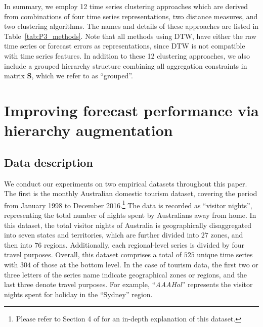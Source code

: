 \documentclass[a4paper,review,12pt,authoryear]{elsarticle}
\begin{document}
In summary, we employ 12 time series clustering approaches which are derived from combinations of four time series representations, two distance measures, and two clustering algorithms. The names and details of these approaches are listed in Table~\ref{tab:P3_methods}. Note that all methods using DTW, have either the raw time series or forecast errors as representations, since DTW is not compatible with time series features. {\color{purple}In addition to these 12 clustering approaches, we also include a grouped hierarchy structure combining all aggregation constraints in matrix $\boldsymbol{S}$, which we refer to as ``grouped''.} 







\section{Improving forecast performance via hierarchy augmentation}\label{sec:cluster}
\subsection{Data description}

We conduct our experiments on two empirical datasets throughout this paper. The first is the monthly Australian domestic tourism dataset, covering the period from January 1998 to December 2016.\footnote{Please refer to Section 4 of \cite{wickramasuriyaOptimalForecastReconciliation2019} for an in-depth explanation of this dataset.} The data is recorded as ``visitor nights'', representing the total number of nights spent by Australians away from home. In this dataset, the total visitor nights of Australia is geographically disaggregated into seven states and territories, which are further divided into $27$ zones, and then into $76$ regions. Additionally, each regional-level series is divided by four travel purposes. Overall, this dataset comprises a total of {\color{purple}$525$} unique time series with $304$ of those at the bottom level. In the case of tourism data, the first two or three letters of the series name indicate geographical zones or regions, and the last three denote travel purposes. For example, ``\textit{AAAHol}'' represents the visitor nights spent for holiday in the ``Sydney'' region.
\end{document}

